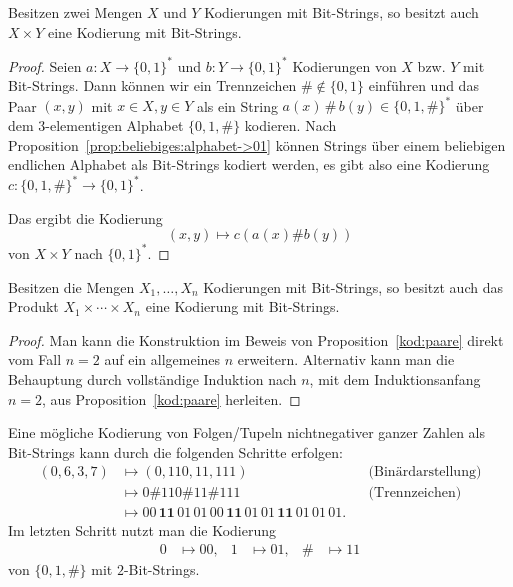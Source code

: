 \begin{prop} \label{kod:paare}
	Besitzen zwei Mengen $X$ und $Y$ Kodierungen mit Bit-Strings, so besitzt auch $X \times Y$ eine Kodierung mit Bit-Strings. 
\end{prop} 
\begin{proof}
	Seien $ a : X \to \{0,1\}^\ast$ und $b : Y \to \{0,1\}^\ast$ Kodierungen von $X$ bzw. $Y$ mit Bit-Strings. Dann können wir ein Trennzeichen $\# \not\in \{0,1\}$ einführen und das Paar $(x,y)$ mit $x \in X, y \in Y$ als ein String $a(x) \, \# \,  b(y) \in \{0,1,\#\}^\ast$ über dem $3$-elementigen Alphabet $\{0,1,\#\}$ kodieren. Nach Proposition~\ref{prop:beliebiges:alphabet->01} können Strings über einem beliebigen endlichen Alphabet als Bit-Strings kodiert werden, es gibt also eine Kodierung $c : \{0,1,\#\}^\ast \to \{0,1\}^\ast$.

	 Das ergibt die Kodierung 
	 \[
	 		(x,y) \mapsto c ( a(x) \# b(y))
	 \] 
	 von $X \times Y$ nach $\{0,1\}^\ast$. 
\end{proof} 

\begin{kor} \label{kod:tupel}
	Besitzen die Mengen $X_1,\ldots,X_n$ Kodierungen mit Bit-Strings, so besitzt auch das Produkt $X_1 \times \cdots \times X_n$ eine Kodierung mit Bit-Strings. 
\end{kor} 
\begin{proof} 
Man kann die Konstruktion im Beweis von Proposition~\ref{kod:paare} direkt vom Fall $n=2$ auf ein allgemeines $n$ erweitern. Alternativ kann man die Behauptung durch vollständige Induktion nach $n$, mit dem Induktionsanfang $n=2$, aus Proposition~\ref{kod:paare} herleiten. 
\end{proof} 

\begin{bsp}
	Eine mögliche Kodierung von Folgen/Tupeln nichtnegativer ganzer Zahlen als Bit-Strings kann durch die folgenden Schritte erfolgen: 
	\begin{align*}
		(0, 6,3,7) & \mapsto (0,110,11,111)  & & \text{(Binärdarstellung)} 
		\\ & \mapsto 0 \mathbf{\#} 110 \mathbf{\#} 11 \mathbf{\#} 111 & & \text{(Trennzeichen)} 		
		\\ & \mapsto  00 \, \mathbf{11} \,  01 \,  01 \, 00 \, \mathbf{11 }\, 01 \, 01 \, \mathbf{11} \, 01 \, 01 \, 01.
	\end{align*}
	Im letzten Schritt nutzt man die Kodierung 
	\begin{align*}
		0 & \mapsto 00, & 1& \mapsto 01, &  \# & \mapsto 11
	\end{align*}
	von $\{0,1,\#\}$ mit $2$-Bit-Strings. 
\end{bsp} 


